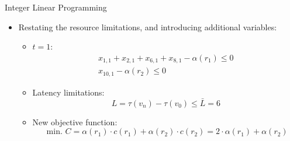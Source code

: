 \begin{frame}[allowframebreaks]{Integer Linear Programming}
  \begin{solutionnoinc}
    \begin{itemize}
      \item \alert{Restating the resource limitations, and introducing additional variables:}
        \begin{itemize}
          \item $t=1$:
            \[
            \begin{gathered}
            x_{1,1}+x_{2,1}+x_{6,1}+x_{8,1}-\alpha\left(r_1\right) \leq 0 \\
            x_{10,1}-\alpha\left(r_2\right) \leq 0
            \end{gathered}
            \]
          \item \alert{Latency limitations:}
            \[
            L=\tau\left(v_n\right)-\tau\left(v_0\right) \leq \bar{L}=6
            \]
          \item \alert{New objective function:}
            \[
            \text { min. } C=\alpha\left(r_1\right) \cdot c\left(r_1\right)+\alpha\left(r_2\right) \cdot c\left(r_2\right)=2 \cdot \alpha\left(r_1\right)+\alpha\left(r_2\right)
            \]
        \end{itemize}
    \end{itemize}
  \end{solutionnoinc}
\end{frame}
